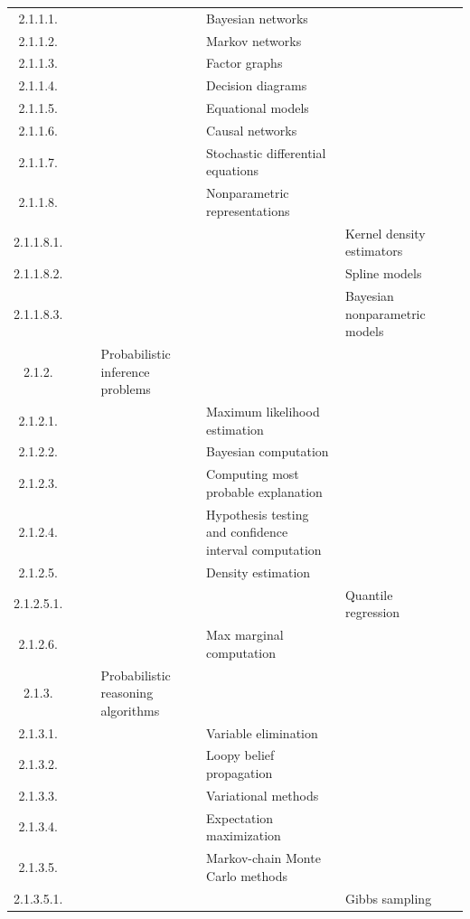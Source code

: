 \documentclass[12pt]{article}
\begin{document}
\begin{center}
{\begin{tabularx}{\linewidth}{|c|X|X|X|X|X|X|}
		2.1.1.1. &   &   &   &  Bayesian networks &   &   \\
		2.1.1.2. &   &   &   &  Markov networks &   &   \\
		2.1.1.3. &   &   &   &  Factor graphs &   &   \\
		2.1.1.4. &   &   &   &  Decision diagrams &   &   \\
		2.1.1.5. &   &   &   &  Equational models &   &   \\
		2.1.1.6. &   &   &   &  Causal networks &   &   \\
		2.1.1.7. &   &   &   &  Stochastic differential equations &   &   \\
		2.1.1.8. &   &   &   &  Nonparametric representations &   &   \\
		2.1.1.8.1. &   &   &   &   &  Kernel density estimators &   \\
		2.1.1.8.2. &   &   &   &   &  Spline models &   \\
		2.1.1.8.3. &   &   &   &   &  Bayesian nonparametric models &   \\
		2.1.2. &   &   &  Probabilistic inference problems &   &   &   \\
		2.1.2.1. &   &   &   &  Maximum likelihood estimation &   &   \\
		2.1.2.2. &   &   &   &  Bayesian computation &   &   \\
		2.1.2.3. &   &   &   &  Computing most probable explanation &   &   \\
		2.1.2.4. &   &   &   &  Hypothesis testing and confidence interval computation &   &   \\
		2.1.2.5. &   &   &   &  Density estimation &   &   \\
		2.1.2.5.1. &   &   &   &   &  Quantile regression &   \\
		2.1.2.6. &   &   &   &  Max marginal computation &   &   \\
		2.1.3. &   &   &  Probabilistic reasoning algorithms &   &   &   \\
		2.1.3.1. &   &   &   &  Variable elimination &   &   \\
		2.1.3.2. &   &   &   &  Loopy belief propagation &   &   \\
		2.1.3.3. &   &   &   &  Variational methods &   &   \\
		2.1.3.4. &   &   &   &  Expectation maximization &   &   \\
		2.1.3.5. &   &   &   &  Markov-chain Monte Carlo methods &   &   \\
		2.1.3.5.1. &   &   &   &   &  Gibbs sampling &   \\

\end{tabularx}}
\end{center}
\end{document}
